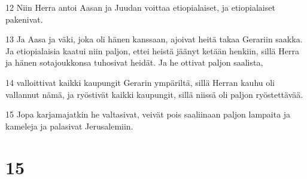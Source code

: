 \par 12 Niin Herra antoi Aasan ja Juudan voittaa etiopialaiset, ja etiopialaiset pakenivat.
\par 13 Ja Aasa ja väki, joka oli hänen kanssaan, ajoivat heitä takaa Gerariin saakka. Ja etiopialaisia kaatui niin paljon, ettei heistä jäänyt ketään henkiin, sillä Herra ja hänen sotajoukkonsa tuhosivat heidät. Ja he ottivat paljon saalista,
\par 14 valloittivat kaikki kaupungit Gerarin ympäriltä, sillä Herran kauhu oli vallannut nämä, ja ryöstivät kaikki kaupungit, sillä niissä oli paljon ryöstettävää.
\par 15 Jopa karjamajatkin he valtasivat, veivät pois saaliinaan paljon lampaita ja kameleja ja palasivat Jerusalemiin.

\chapter{15}

